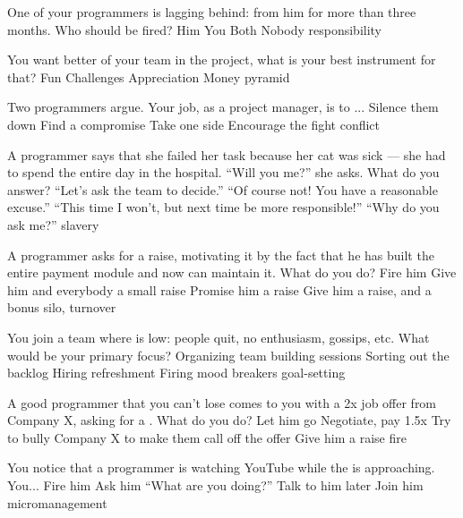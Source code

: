 \documentclass{article}
\begin{document}

\pmbaQuestion
  {One of your programmers is lagging behind: 
    from him for more than three months. Who should be fired?}
  {Him}
  {You}
  {Both}
  {Nobody}
  {responsibility}

\pmbaQuestion
  {You want better  of your team in the project,
    what is your best instrument for that?}
  {Fun}
  {Challenges}
  {Appreciation}
  {Money}
  {pyramid}

\pmbaQuestion
  {Two programmers argue. Your job, as a project manager, is to ...}
  {Silence them down}
  {Find a compromise}
  {Take one side}
  {Encourage the fight}
  {conflict}

\pmbaQuestion
  {A programmer says that she failed her task because
    her cat was sick --- she had to spend the entire day in the hospital.
    ``Will you  me?'' she asks. What do you answer?}
  {``Let's ask the team to decide.''}
  {``Of course not! You have a reasonable excuse.''}
  {``This time I won't, but next time be more responsible!''}
  {``Why do you ask me?''}
  {slavery}

\pmbaQuestion
  {A programmer asks for a raise, motivating it by the fact that
    he has built the entire payment module
    and now  can maintain it. What do you do?}
  {Fire him}
  {Give him and everybody a small raise}
  {Promise him a raise}
  {Give him a raise, and a bonus}
  {silo, turnover}

\pmbaQuestion
  {You join a team where  is low:
    people quit, no enthusiasm, gossips, etc. What would be your primary focus?}
  {Organizing team building sessions}
  {Sorting out the backlog}
  {Hiring refreshment}
  {Firing mood breakers}
  {goal-setting}

\pmbaQuestion
  {A good programmer that you can't lose comes to you
    with a 2x job offer from Company X, asking for a
    . What do you do?}
  {Let him go}
  {Negotiate, pay 1.5x}
  {Try to bully Company X to make them call off the offer}
  {Give him a raise}
  {fire}

\pmbaQuestion
  {You notice that a programmer is watching
    YouTube while the  is approaching. You...}
  {Fire him}
  {Ask him ``What are you doing?''}
  {Talk to him later}
  {Join him}
  {micromanagement}

\end{document}
